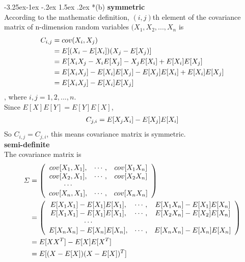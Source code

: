 \documentclass[12pt]{article}
\makeatletter
\renewcommand\subsection{\@startsection{subsection}{2}{\z@}%
	{-3.25ex\@plus -1ex \@minus -.2ex}%
	{1.5ex \@plus .2ex}%
	{\normalfont\large\bfseries}}%
\makeatother
\begin{document}
	\subsection*{(b)}
	\textbf{symmetric}\\
	According to the mathematic definition, $(i,j)$th element of the covariance matrix of n-dimension random variables $(X_1, X_2, ... , X_n$ is 
	\begin{equation}{\label{cov_ij}}
	\begin{aligned}
		C_{i,j}
		&=cov(X_i,X_j)\\
		&=E[(X_i-E[X_i])(X_j-E[X_j)]\\
		&=E[X_iX_j-X_iE[X_j]-X_jE[X_i]+E[X_i]E[X_j]\\
		&=E[X_iX_j]-E[X_i]E[X_j]-E[X_j]E[X_i]+E[X_i]E[X_j]\\
		&=E[X_iX_j]-E[X_i]E[X_j]
	\end{aligned}
	\end{equation}
	\noindent
	, where $i,j=1,2, ... ,n$.\\
	Since $E[X]E[Y]=E[Y]E[X]$,
	\begin{equation}{\label{cov_ji}}
	\begin{aligned}
		C_{j,i}=E[X_jX_i]-E[X_j]E[X_i]
	\end{aligned}
	\end{equation}
	So $C_{i,j} = C_{j,i}$, this means covariance matrix is symmetric.\\
	\textbf{semi-definite}\\
	The covariance matrix is
	\begin{equation}{\label{cov_full}}
	\begin{aligned}
		\varSigma &= 
		\left(
		\begin{array}{ccc}
			cov[X_1,X_1], &\cdots, &cov[X_1X_n]\\
			cov[X_2,X_1], &\cdots, &cov[X_2X_n]\\
			\cdots\\
			cov[X_n,X_1], &\cdots, &cov[X_nX_n]\\
		\end{array}
		\right)\\
		&= 
		\left(
		\begin{array}{ccc}
			E[X_1X_1]-E[X_1]E[X_1], &\cdots, &E[X_1X_n]-E[X_1]E[X_n]\\
			E[X_1X_1]-E[X_1]E[X_1], &\cdots, &E[X_2X_n]-E[X_2]E[X_n]\\
			\cdots\\
			E[X_nX_n]-E[X_n]E[X_n], &\cdots, &E[X_nX_n]-E[X_n]E[X_n]\\
		\end{array}
		\right)\\
		&=E[XX^T]-E[X]E[X^T]\\
		&=E[(X-E[X])(X-E[X])^T]
	\end{aligned}
	\end{equation}
	
\end{document}
